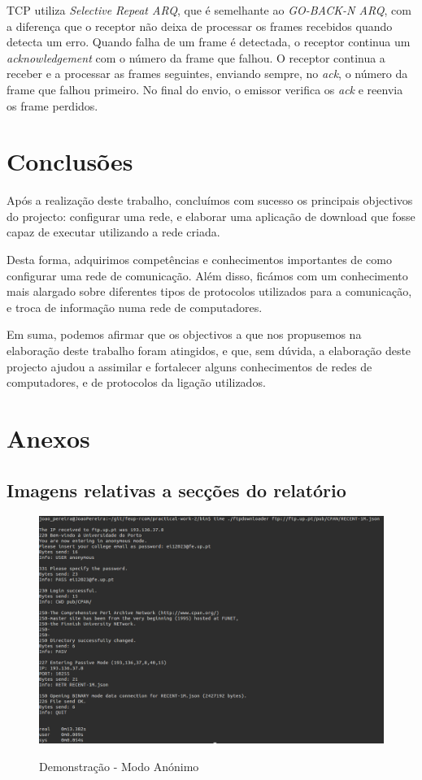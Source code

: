 \documentclass[a4paper]{article}
\begin{document}
TCP utiliza \textit{Selective Repeat ARQ}, que é semelhante ao \textit{GO-BACK-N ARQ}, com a diferença que o receptor não deixa de processar os frames recebidos quando detecta um erro. Quando falha de um frame é detectada, o receptor continua um \textit{acknowledgement} com o número da frame que falhou. O receptor continua a receber e a processar as frames seguintes, enviando sempre, no \textit{ack}, o número da frame que falhou primeiro. No final do envio, o emissor verifica os \textit{ack} e reenvia os frame perdidos.

\section{Conclusões}
Após a realização deste trabalho, concluímos com sucesso os principais objectivos do projecto: configurar uma rede, e elaborar uma aplicação de download que fosse capaz de executar utilizando a rede criada.

Desta forma, adquirimos competências e conhecimentos importantes de como configurar uma rede de comunicação. Além disso, ficámos com um conhecimento mais alargado sobre diferentes tipos de protocolos utilizados para a comunicação, e troca de informação numa rede de computadores.
 
Em suma, podemos afirmar que os objectivos a que nos propusemos na elaboração deste trabalho foram atingidos, e que, sem dúvida, a elaboração deste projecto ajudou a assimilar e fortalecer alguns conhecimentos de redes de computadores, e de protocolos da ligação utilizados.

\clearpage
{}
\renewcommand\refname{Referências}



\newpage
\appendix
\section{Anexos}
\subsection{Imagens relativas a secções do relatório}

\begin{figure}[h!]
\centering
\caption{Demonstração - Modo Anónimo}
\includegraphics[scale=0.3]{res/teste-anonymous.png}
\label{fig:anonymous}
\end{figure}
\end{document}
